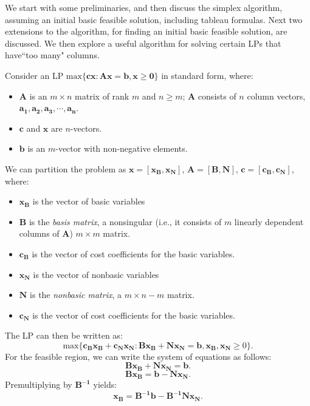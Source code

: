%


We start with some preliminaries, and then discuss the simplex algorithm, assuming an initial basic feasible solution, including tableau formulas.  Next two extensions to the algorithm, for finding an initial basic feasible solution, are discussed. We then explore a useful algorithm for solving certain LPs that have``too many" columns.



Consider an LP $\text{max} \{\mathbf{cx}: \mathbf{Ax} = \mathbf{b}, \mathbf{x} \ge \mathbf{0} \}$ in standard form, where:  

\begin{itemize}
\item $\mathbf{A}$ is an $m \times n$ matrix of rank $m$ and $n \ge m$; $\mathbf{A}$ consists of $n$ column vectors, $\mathbf{a_1}, \mathbf{a_2}, \mathbf{a_3}, \cdots, \mathbf{a_n}$.
\item $\mathbf{c}$ and $\mathbf{x}$ are $n$-vectors.
\item $\mathbf{b}$ is an $m$-vector with non-negative elements.
\end{itemize}

We can partition the problem as $\mathbf{x}= [\mathbf{x_B}, \mathbf{x_N}]$, $\mathbf{A} = [\mathbf{B}, \mathbf{N}]$, $\mathbf{c}= [\mathbf{c_B}, \mathbf{c_N}]$, where:  

\begin{itemize}
\item $\mathbf{x_B}$ is the vector of basic variables
\item $\mathbf{B}$ is the {\it basis matrix}, a nonsingular (i.e., it consists of $m$ linearly dependent columns of $\mathbf{A}$) $m \times m$ matrix.
\item $\mathbf{c_B}$ is the vector of cost coefficients for the basic variables.
\item $\mathbf{x_N}$ is the vector of nonbasic variables
\item $\mathbf{N}$ is the {\it nonbasic matrix}, a $m \times n-m$ matrix.
\item $\mathbf{c_N}$ is the vector of cost coefficients for the basic variables.
\end{itemize}

The LP can then be written as:  
$$\text{max} \{\mathbf{c_Bx_B} + \mathbf{c_Nx_N}: \mathbf{Bx_B} + \mathbf{Nx_N} = \mathbf{b}, \mathbf{x_B, x_N} \ge 0\}.$$
For the feasible region, we can write the system of equations as follows: \\
$$\mathbf{B} \mathbf{x_B} + \mathbf{N} \mathbf{x_N} = \mathbf{b}.$$ 
$$\mathbf{B} \mathbf{x_B}  = \mathbf{b}-  \mathbf{N} \mathbf{x_N}.$$ 
Premultiplying by $\mathbf{B^{-1}}$ yields:  
$$\mathbf{x_B} = \mathbf{B^{-1}}\mathbf{b} - \mathbf{B^{-1}} \mathbf{N} \mathbf{x_N}.$$ 

